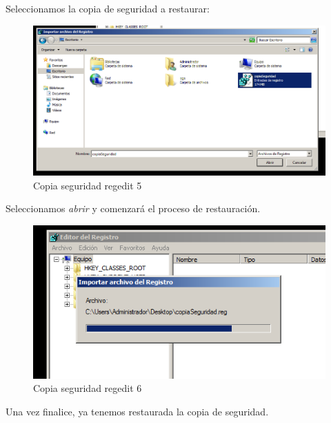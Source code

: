 Seleccionamos la copia de seguridad a restaurar:

\begin{figure}[H] %
	\centering
	\includegraphics[scale=0.5]{pics/reg5}  %
	\caption{Copia seguridad regedit 5} \label{fig:reg5}
\end{figure}

Seleccionamos \textit{abrir} y comenzará el proceso de restauración.

\begin{figure}[H] %
	\centering
	\includegraphics[scale=0.5]{pics/reg6}  %
	\caption{Copia seguridad regedit 6} \label{fig:reg6}
\end{figure}

Una vez finalice, ya tenemos restaurada la copia de seguridad.



